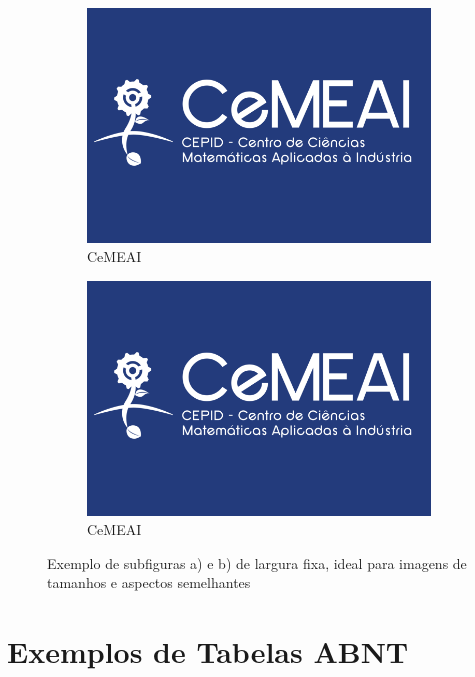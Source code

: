 \begin{figure}[H]
    \centering
    \begin{subfigure}{0.48\linewidth}
        \centering
        \includegraphics[width=\linewidth]{Figuras/CEMEAI.png}
        \caption{CeMEAI \cite{cemeai}}
    \end{subfigure}
    \hfill
    \begin{subfigure}{0.48\linewidth}
        \centering
        \includegraphics[width=\linewidth]{Figuras/CEMEAI.png}
        \caption{CeMEAI \cite{cemeai}}
    \end{subfigure}
    \caption{Exemplo de subfiguras a) e b) de largura fixa, ideal para imagens de tamanhos e aspectos semelhantes}
    \label{fig:largurafixa2}
\end{figure}



\section{Exemplos de Tabelas ABNT}

